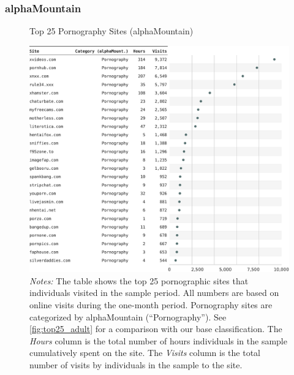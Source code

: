 \documentclass[12pt,twoside]{article}
\begin{document}
\subsubsection{alphaMountain}
\begin{figure}[!ht]
	\centering
	\caption{Top 25 Pornography Sites (alphaMountain)}
	\includegraphics[width=\textwidth]{figs/top_25_adultsites_alphamountain.pdf}
	\caption*{\footnotesize \emph{Notes:} 
		The table shows the top 25 pornographic sites that individuals visited in the sample period.
            All numbers are based on online visits during the one-month period.
		Pornography sites are categorized by alphaMountain (``Pornography'').
            See \cref{fig:top25_adult} for a comparison with our base classification.
    	The \emph{Hours} column is the total number of hours individuals in the sample cumulatively spent on the site. 
    	The \emph{Visits} column is the total number of visits by individuals in the sample to the site.            
	}
	\label{fig:top25_adult_alphamountain}
\end{figure}




\end{document}
